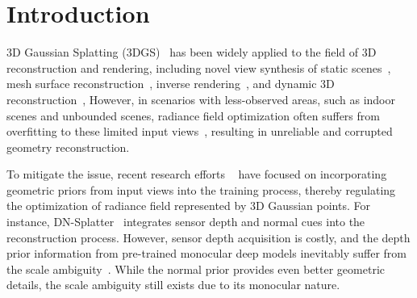 \section{Introduction}
\label{sec:intro}

3D Gaussian Splatting (3DGS)~\citep{kerbl20233d} has been widely applied to the field of 3D reconstruction and rendering, including novel view synthesis of static scenes~\citep{kerbl20233d, yu2024mip}, mesh surface reconstruction~\citep{guedon2024sugar, yu2024gaussian}, inverse rendering~\citep{liang2024gs, gao2023relightable}, and dynamic 3D reconstruction~\citep{wu20244d, lin2024gaussian},
%
However, in scenarios with less-observed areas, such as indoor scenes and unbounded scenes, radiance field optimization often suffers from overfitting to these limited input views~\citep{li2024dngaussian}, 
resulting in unreliable and corrupted 
geometry reconstruction.
%

To mitigate the issue, recent research efforts
~\citep{li2024dngaussian, paliwal2024coherentgs, turkulainen2024dnsplatter} 
have focused on incorporating geometric priors 
from input views into the training process, thereby 
regulating the optimization of radiance field 
represented by 3D Gaussian points. 
%
For instance, DN-Splatter~\citep{turkulainen2024dnsplatter} 
integrates sensor depth and normal cues 
into the reconstruction process. 
%
However, sensor depth acquisition is costly,
and the depth prior information from pre-trained 
monocular deep models inevitably suffer from the scale ambiguity~\citep{liu2023robust}.
While the normal prior provides even better geometric details, the scale ambiguity still exists due to its monocular nature.



